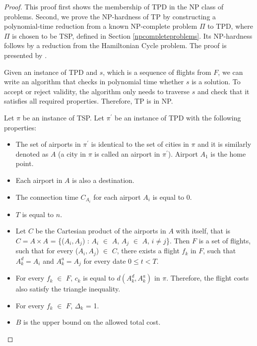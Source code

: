 \documentclass{mpaper}
\begin{document}
\begin{proof}
This proof first shows the membership of TPD in the NP class of problems. Second, we prove the NP-hardness of TP by constructing a polynomial-time reduction from a known NP-complete problem $\Pi$ to TPD, where $\Pi$ is chosen to be TSP, defined in Section \ref{npcompleteproblems}. Its NP-hardness follows by a reduction from the Hamiltonian Cycle problem. The proof is presented by
\cite{thebible}.

Given an instance of TPD and $s$, which is a sequence of flights from $F$, we can write an algorithm that checks in polynomial time whether $s$ is a solution. To accept or reject validity, the algorithm only needs to traverse $s$ and check that it satisfies all required properties. Therefore, TP is in NP.

Let $\pi$ be an instance of TSP. Let $\pi^{\prime}$ be an instance of TPD with the following properties:
\begin{itemize}
\item The set of airports in $\pi^{\prime}$ is identical to the set of cities in $\pi$ and it is similarly denoted as $A$ (a city in $\pi$ is called an airport in $\pi^{\prime}$). Airport $A_{1}$ is the home point.
\item Each airport in $A$ is also a destination.
\item The connection time $C_{A_{i}}$ for each airport $A_{i}$ is equal to 0.
\item $T$ is equal to $n$.
\item Let $C$ be the Cartesian product of the airports in $A$ with itself, that is $C = A \times A$ = \{($A_{i}, A_{j}$) : $A_{i}$ $\in$ $A$, $A_{j}$ $\in$ $A$, $i \neq j$\}. Then $F$ is a set of flights, such that for every ($A_{i}, A_{j}$) $\in$ $C$, there exists a flight $f_{k}$ in $F$, such that $A^{d}_{k} = A_{i}$ and $A^{a}_{k} = A_{j}$ for every date $0 \leq t < T$.
\item For every $f_{k}$ $\in$ $F$, $c_{k}$ is equal to $d(A^{d}_{k}, A^{a}_{k})$ in $\pi$. Therefore, the flight costs also satisfy the triangle inequality.
\item For every $f_{k}$ $\in$ $F$, $\Delta_{k}$ = 1.
\item $B$ is the upper bound on the allowed total cost.
\end{itemize}



\end{proof}
\end{document}
